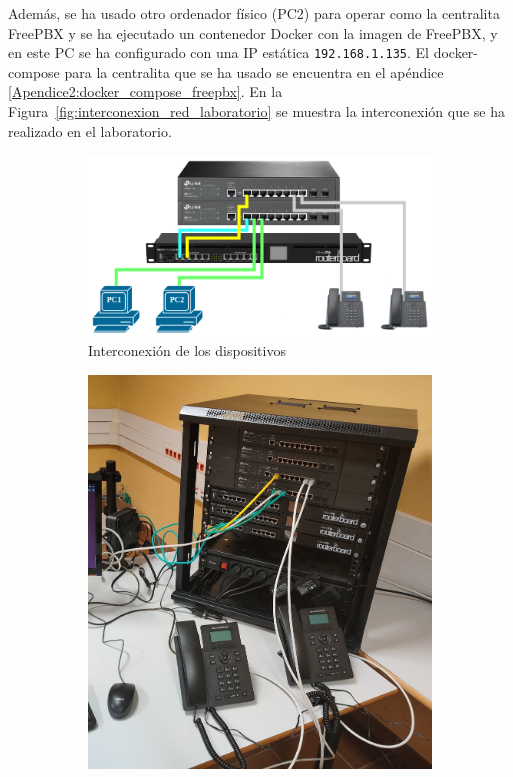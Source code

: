 Además, se ha usado otro ordenador físico (PC2) para operar como la centralita FreePBX y se ha ejecutado un contenedor Docker con
la imagen de FreePBX, y en este PC se ha configurado con una IP estática \texttt{192.168.1.135}. El docker-compose para la centralita
que se ha usado se encuentra en el apéndice \ref{Apendice2:docker_compose_freepbx}. En la Figura~\ref{fig:interconexion_red_laboratorio} se muestra
la interconexión que se ha realizado en el laboratorio.
\begin{figure}[H]
	\centering
	\begin{subfigure}[b]{0.59\textwidth}
		\centering
		\includegraphics[width=\textwidth]{images/interconexion_red_laboratorio.png}
		\caption{Interconexión de los dispositivos}
		\label{fig:interconexion_red}
	\end{subfigure}
	\hfill
	\begin{subfigure}[b]{0.39\textwidth}
		\centering
		\includegraphics[width=\textwidth]{images/laboratorio.jpeg}

\end{subfigure}
\end{figure}
